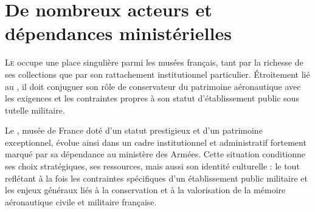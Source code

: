 \chapter[Acteurs et dépendances]{\label{I-B}De nombreux acteurs et dépendances ministérielles }


\lettrine{L}e \maelong occupe une place singulière parmi les musées français, tant par la richesse de ses collections que par son rattachement institutionnel particulier. Étroitement lié au \minarm, il doit conjuguer son rôle de conservateur du patrimoine aéronautique avec les exigences et les contraintes propres à son statut d’établissement public sous tutelle militaire.





\bigskip
\bigskip
\bigskip


Le \maelong, musée de France doté d’un statut prestigieux et d’un patrimoine exceptionnel, évolue ainsi dans un cadre institutionnel et administratif fortement marqué par sa dépendance au ministère des Armées. Cette situation conditionne ses choix stratégiques, ses ressources, mais aussi son identité culturelle : le tout reflétant à la fois les contraintes spécifiques d’un établissement public militaire et les enjeux généraux liés à la conservation et à la valorisation de la mémoire aéronautique civile et militaire française.

\bigskip
\bigskip
\bigskip